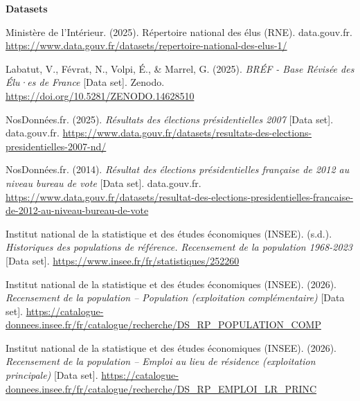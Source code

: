 \documentclass[11pt,a4paper]{article}
\newenvironment{references}{\sloppy\list{}{\leftmargin=1.5em \itemindent=-1.5em \itemsep=0.3em \parsep=0pt}}{\endlist}
\begin{document}
\textbf{Datasets}

\begin{references}
  \item Ministère de l'Intérieur. (2025). Répertoire national des élus (RNE). data.gouv.fr. \url{https://www.data.gouv.fr/datasets/repertoire-national-des-elus-1/}
  \item Labatut, V., Févrat, N., Volpi, É., \& Marrel, G. (2025). \textit{BRÉF - Base Révisée des Élu·es de France} [Data set]. Zenodo. \url{https://doi.org/10.5281/ZENODO.14628510}
  \item NosDonnées.fr. (2025). \textit{Résultats des élections présidentielles 2007} [Data set]. data.gouv.fr. \url{https://www.data.gouv.fr/datasets/resultats-des-elections-presidentielles-2007-nd/}
  \item NosDonnées.fr. (2014). \textit{Résultat des élections présidentielles française de 2012 au niveau bureau de vote} [Data set]. data.gouv.fr. \url{https://www.data.gouv.fr/datasets/resultat-des-elections-presidentielles-francaise-de-2012-au-niveau-bureau-de-vote}
  \item Institut national de la statistique et des études économiques (INSEE). (s.d.). \textit{Historiques des populations de référence. Recensement de la population 1968-2023} [Data set]. \url{https://www.insee.fr/fr/statistiques/252260}
  \item Institut national de la statistique et des études économiques (INSEE). (2026). \textit{Recensement de la population -- Population (exploitation complémentaire)} [Data set]. \url{https://catalogue-donnees.insee.fr/fr/catalogue/recherche/DS_RP_POPULATION_COMP}
  \item Institut national de la statistique et des études économiques (INSEE). (2026). \textit{Recensement de la population -- Emploi au lieu de résidence (exploitation principale)} [Data set]. \url{https://catalogue-donnees.insee.fr/fr/catalogue/recherche/DS_RP_EMPLOI_LR_PRINC}
\end{references}
\end{document}
